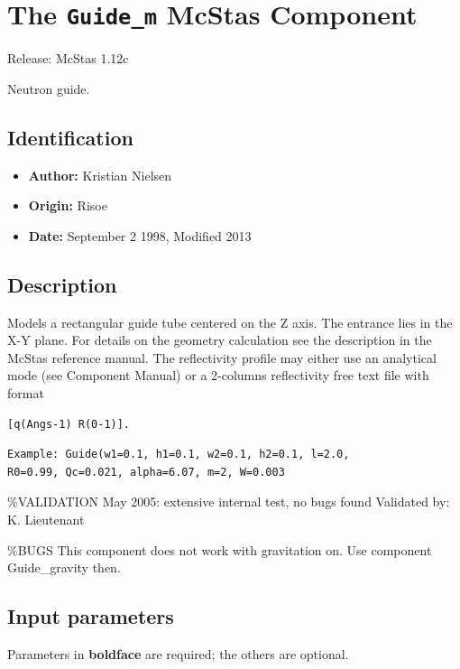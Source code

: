 \section{The \texttt{Guide\_m} McStas Component}
Release: McStas 1.12c

Neutron guide.

\subsection*{Identification}
\begin{itemize}
  \item \textbf{Author:} Kristian Nielsen
  \item \textbf{Origin:} Risoe
  \item \textbf{Date:} September 2 1998, Modified 2013
\end{itemize}

\subsection*{Description}
Models a rectangular guide tube centered on the Z axis. The entrance lies in the X-Y plane. For details on the geometry calculation see the description in the McStas reference manual. The reflectivity profile may either use an analytical mode (see Component Manual) or a 2-columns reflectivity free text file with format

\begin{verbatim}
[q(Angs-1) R(0-1)].
\end{verbatim}

\begin{verbatim}
Example: Guide(w1=0.1, h1=0.1, w2=0.1, h2=0.1, l=2.0,
R0=0.99, Qc=0.021, alpha=6.07, m=2, W=0.003
\end{verbatim}

\%VALIDATION May 2005: extensive internal test, no bugs found Validated by: K. Lieutenant

\%BUGS This component does not work with gravitation on. Use component Guide\_gravity then.

\subsection*{Input parameters}
Parameters in \textbf{boldface} are required; the others are optional.

